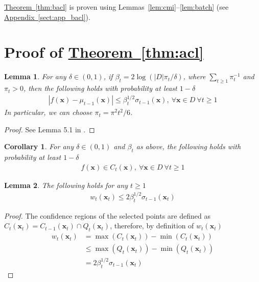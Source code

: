 \documentclass{article}
\def\*#1{\bm{#1}}
\newcommand{\theoremref}[1]{\hyperref[#1]{\mbox{Theorem~\ref*{#1}}}}
\newcommand{\appref}[1]{\hyperref[#1]{\mbox{Appendix~\ref*{#1}}}}
\newtheorem{lemma}{Lemma}
\newtheorem{cor}{Corollary}
\begin{document}
\theoremref{thm:bacl} is proven using
Lemmas~\ref{lem:cmi}--\ref{lem:batch}  (see \appref{sect:app_bacl}).





\appendix
\section{Proof of \theoremref{thm:acl}} \label{sect:app_acl}

\begin{lemma}
\label{lem:srin1}
For any $\delta \in (0, 1)$, if $\beta_t = 2\log(|D|\pi_t/\delta)$, where
$\sum_{t\geq1}\pi_t^{-1}$ and $\pi_t > 0$, then the following holds with
probability at least $1-\delta$
\begin{align*}
|f(\*x) - \mu_{t-1}(\*x)| \leq \beta_t^{1/2}\sigma_{t-1}(\*x),\ \forall \*x \in D\ \forall t \geq 1
\end{align*}
In particular, we can choose $\pi_t = \pi^2 t^2/6$.
\end{lemma}
\begin{proof}
See Lemma 5.1 in \cite{srinivas2010}.
\end{proof}

\begin{cor}
\label{cor:cs}
For any $\delta \in (0, 1)$ and $\beta_t$ as above, the following holds
with probability at least $1-\delta$
\begin{align*}
f(\*x) \in C_t(\*x),\ \forall \*x \in D\ \forall t \geq 1
\end{align*}
\end{cor}

\begin{lemma}
\label{lem:wb}
The following holds for any $t \geq 1$
\begin{align*}
w_t(\*x_t) \leq 2\beta_t^{1/2}\sigma_{t-1}(\*x_t)
\end{align*}
\end{lemma}
\begin{proof}
The confidence regions of the selected points are defined as
$C_t(\*x_t) = C_{t-1}(\*x_t) \cap Q_t(\*x_t)$, therefore, by
definition of $w_t(\*x_t)$
\begin{align*}
w_t(\*x_t) &= \max(C_t(\*x_t)) - \min(C_t(\*x_t))\\
&\leq \max(Q_t(\*x_t)) - \min(Q_t(\*x_t))\\
&=2\beta_t^{1/2}\sigma_{t-1}(\*x_t)
\end{align*}
\end{proof}
\end{document}
